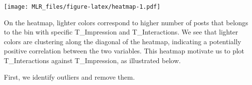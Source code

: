\documentclass[
]{article}
\newenvironment{Shaded}{\begin{snugshade}}{\end{snugshade}}
\newcommand{\CommentTok}[1]{\textcolor[rgb]{0.56,0.35,0.01}{\textit{#1}}}
\newcommand{\DataTypeTok}[1]{\textcolor[rgb]{0.13,0.29,0.53}{#1}}
\newcommand{\DecValTok}[1]{\textcolor[rgb]{0.00,0.00,0.81}{#1}}
\newcommand{\KeywordTok}[1]{\textcolor[rgb]{0.13,0.29,0.53}{\textbf{#1}}}
\newcommand{\NormalTok}[1]{#1}
\newcommand{\OperatorTok}[1]{\textcolor[rgb]{0.81,0.36,0.00}{\textbf{#1}}}
\newcommand{\StringTok}[1]{\textcolor[rgb]{0.31,0.60,0.02}{#1}}
\begin{document}
\begin{Shaded}
\end{Shaded}

\texttt{[image: MLR\_files/figure-latex/heatmap-1.pdf]}

On the heatmap, lighter colors correspond to higher number of posts that
belongs to the bin with specific T\_Impression and T\_Interactions. We
see that lighter colors are clustering along the diagonal of the
heatmap, indicating a potentially positive correlation between the two
variables. This heatmap motivate us to plot T\_Interactions against
T\_Impression, as illustrated below.

First, we identify outliers and remove them.

\begin{Shaded}
\end{Shaded}
\end{document}
